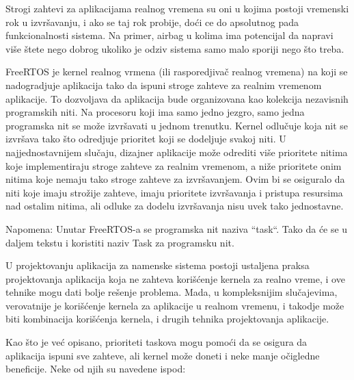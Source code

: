 \documentclass[a4paper,12pt, master]{etf}
\begin{document}
	Strogi zahtevi za aplikacijama realnog vremena su oni u kojima postoji vremenski rok u
	izvr\v{s}avanju, i ako se taj rok probije, do\'{c}i ce do apsolutnog pada funkcionalnosti sistema. 
	Na primer, airbag u kolima ima potencijal da napravi vi\v{s}e \v{s}tete nego dobrog ukoliko je 
	odziv sistema samo malo sporiji nego \v{s}to treba.

	FreeRTOS je kernel realnog vrmena (ili rasporedjiva\v{c} realnog 
	vremena) na	koji se nadogradjuje aplikacija tako da ispuni stroge zahteve za realnim 
	vremenom aplikacije. To dozvoljava da aplikacija bude organizovana kao kolekcija 
	nezavisnih programskih niti. Na	procesoru koji ima samo jedno jezgro, samo jedna 
	programska nit se mo\v{z}e izvr\v{s}avati u jednom trenutku. Kernel odlu\v{c}uje koja nit se 
	izvr\v{s}ava tako \v{s}to odredjuje prioritet koji se dodeljuje svakoj niti. U najjednostavnijem 
	slu\v{c}aju, dizajner aplikacije mo\v{z}e odrediti vi\v{s}e prioritete nitima koje implementiraju stroge 
	zahteve za realnim vremenom, a ni\v{z}e prioritete onim nitima koje nemaju tako stroge zahteve 
	za izvr\v{s}avanjem. Ovim bi se osiguralo da niti koje imaju stro\v{z}ije zahteve, imaju 
	prioritete izvr\v{s}avanja i pristupa resursima nad ostalim nitima, ali odluke za dodelu 
	izvr\v{s}avanja nisu uvek tako jednostavne.

	Napomena: Unutar FreeRTOS-a se programska nit naziva ``task``. Tako da \'{c}e se u daljem tekstu 
	i koristiti naziv Task za programsku nit.

	U projektovanju aplikacija za namenske sistema postoji ustaljena praksa projektovanja
	aplikacija koja ne zahteva kori\v{s}\'{c}enje kernela za realno vreme, i ove tehnike mogu dati 
	bolje re\v{s}enje problema. Mada, u kompleksnijim slu\v{c}ajevima, verovatnije je kori\v{s}\'{c}enje 
	kernela za aplikacije u realnom vremenu, i takodje mo\v{z}e biti kombinacija kori\v{s}\'{c}enja 
	kernela, i drugih tehnika projektovanja aplikacije.

	Kao \v{s}to je ve\'{c} opisano, prioriteti taskova mogu pomo\'{c}i da se osigura da aplikacija ispuni 
	sve	zahteve, ali kernel mo\v{z}e doneti i neke manje o\v{c}igledne beneficije. Neke od njih su 
	navedene ispod:
	
\end{document}
